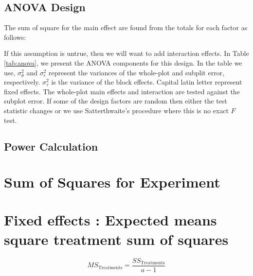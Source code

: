 \documentclass{article}
\begin{document}
\subsection{ANOVA Design}
The sum of square for the main effect are found from the totals for each factor as follows:





If this assumption is untrue, then we will want to add interaction effects. In Table \ref{tab:anova}, we present the ANOVA components for this design. In the table we use, $\sigma_{\theta}^{2}$ and $\sigma_{\epsilon}^{2}$ represent the variances of the whole-plot and subplit error, respectively. $\sigma_{\tau}^{2}$ is the variance of the block effects. Capital latin letter represent fixed effects. The whole-plot main effects and interaction are tested against the subplot error. If some of the design factors are random then either the test statistic changes or we use Satterthwaite's procedure where this is no exact $F$ test.\\


\subsection{Power Calculation}

\appendix

\section{Sum of Squares for Experiment}


\section{Fixed effects : Expected means square treatment sum of squares}
\[
    MS_{\text{Treatments}} = \frac{SS_{\text{Treatments}}}{a - 1}
\]
\end{document}
